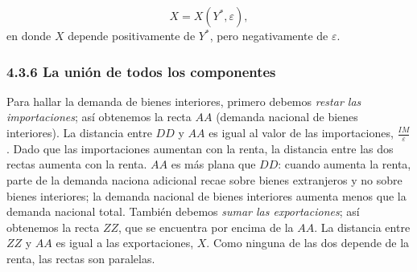 \documentclass[10pt, landscape]{article}
\begin{document}
\begin{multicols*}{3}
\[ X = X(Y^*, \varepsilon), \]
en donde $X$ depende positivamente de $Y^*$, pero negativamente de $\varepsilon$.

\vfill\null
\columnbreak
\subsubsection{4.3.6 La unión de todos los componentes}
Para hallar la demanda de bienes interiores, primero debemos \textit{restar las importaciones}; así obtenemos la recta $AA$ (demanda nacional de bienes interiores). La distancia entre $DD$ y $AA$ es igual al valor de las importaciones, $\frac{IM}{\varepsilon}$. Dado que las importaciones aumentan con la renta, la distancia entre las dos rectas aumenta con la renta. $AA$ es más plana que $DD$: cuando aumenta la renta, parte de la demanda naciona adicional recae sobre bienes extranjeros y no sobre bienes interiores; la demanda nacional de bienes interiores aumenta menos que la demanda nacional total. También debemos \textit{sumar las exportaciones}; así obtenemos la recta $ZZ$, que se encuentra por encima de la $AA$. La distancia entre $ZZ$ y $AA$ es igual a las exportaciones, $X$. Como ninguna de las dos depende de la renta, las rectas son paralelas.

\begin{center}
\end{center}
\end{multicols*}
\end{document}
